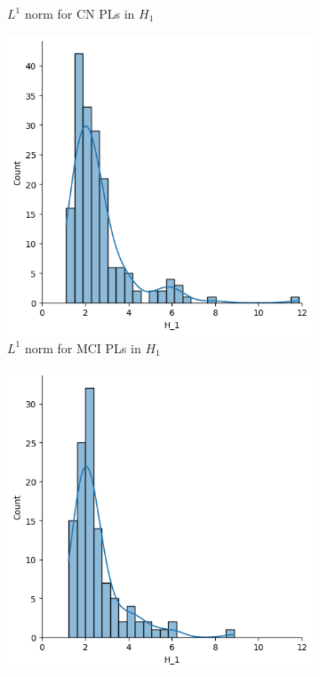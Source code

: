 \documentclass{article}
\begin{document}
\begin{figure}[htb]
\begin{subfigure}{0.32\textwidth}
    \caption{$L^1$ norm for CN PLs in $H_1$}
  \end{subfigure}
  \begin{subfigure}{0.32\textwidth}
    \includegraphics[width=\textwidth]{figures/median_pls/median_pl_MCI_H_1_displot.png}
    \caption{$L^1$ norm for MCI PLs in $H_1$}
  \end{subfigure}
  \begin{subfigure}{0.32\textwidth}
    \includegraphics[width=\textwidth]{figures/median_pls/median_pl_AD_H_1_displot.png}

\end{subfigure}
\end{figure}
\end{document}
